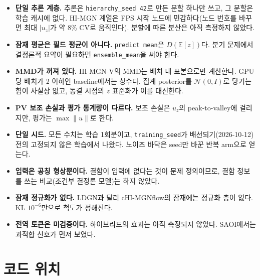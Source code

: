 \documentclass[11pt]{article}
\newcommand{\E}{\mathbb{E}}
\newcommand{\N}{\mathcal{N}}
\newcommand{\code}[1]{\texttt{#1}}
\begin{document}
\begin{itemize}
\item \textbf{단일 추론 계층.} 추론은 \code{hierarchy\_seed 42}로 만든 분할
  하나만 쓰고, 그 분할은 학습 캐시에 없다. HI-MGN 계열은 FPS 시작 노드에
  민감하다(노드 번호를 바꾸면 최대 $|u_z|$가 약 8\% CV로 움직인다). 분할에
  따른 분산은 아직 측정하지 않았다.
\item \textbf{잠재 평균은 필드 평균이 아니다.} \code{predict mean}은
  $D(\E[z])$다. 분기 문제에서 결정론적 요약이 필요하면 \code{ensemble\_mean}을
  써야 한다.
\item \textbf{MMD가 꺼져 있다.} HI-MGN-V의 MMD는 배치 내 표본으로만 계산한다.
  GPU당 배치가 2 이하인 baseline에서는 상수다. 집계 posterior를 $\N(0,I)$로
  당기는 힘이 사실상 없고, 동결 시점의 $z$ 표준화가 이를 대신한다.
\item \textbf{PV 보조 손실과 평가 통계량이 다르다.} 보조 손실은 $u_z$의
  peak-to-valley에 걸리지만, 평가는 $\max\|u\|$로 한다.
\item \textbf{단일 시드.} 모든 수치는 학습 1회분이고, \code{training\_seed}가
  배선되기(2026-10-12) 전의 고정되지 않은 학습에서 나왔다. 노이즈 바닥은
  seed만 바꾼 반복 arm으로 얻는다.
\item \textbf{입력은 공칭 형상뿐이다.} 결함이 입력에 없다는 것이 문제
  정의이므로, 결함 정보를 쓰는 비교(조건부 결정론 모델)는 하지 않았다.
\item \textbf{잠재 정규화가 없다.} LDGN과 달리 cHI-MGNflow의 잠재에는 정규화
  층이 없다. KL $10^{-6}$만으로 척도가 정해진다.
\item \textbf{전역 토큰은 미검증이다.} 하이브리드의 효과는 아직 측정되지
  않았다. SAOI에서는 과적합 신호가 먼저 보였다.
\end{itemize}

\section{코드 위치}\label{sec:code}
\end{document}
